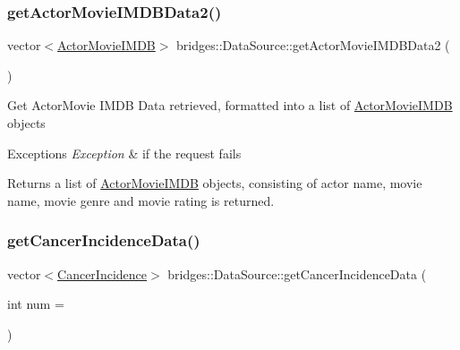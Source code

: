 \subsubsection{\texorpdfstring{getActorMovieIMDBData2()}{getActorMovieIMDBData2()}}
{\footnotesize\ttfamily vector$<$\mbox{\hyperlink{classbridges_1_1_actor_movie_i_m_d_b}{Actor\+Movie\+I\+M\+DB}}$>$ bridges\+::\+Data\+Source\+::get\+Actor\+Movie\+I\+M\+D\+B\+Data2 (\begin{DoxyParamCaption}{ }\end{DoxyParamCaption})\hspace{0.3cm}{\ttfamily [inline]}}

Get Actor\+Movie I\+M\+DB Data retrieved, formatted into a list of \mbox{\hyperlink{classbridges_1_1_actor_movie_i_m_d_b}{Actor\+Movie\+I\+M\+DB}} objects


\begin{DoxyExceptions}{Exceptions}
{\em Exception} & if the request fails\\
\hline
\end{DoxyExceptions}
\begin{DoxyReturn}{Returns}
a list of \mbox{\hyperlink{classbridges_1_1_actor_movie_i_m_d_b}{Actor\+Movie\+I\+M\+DB}} objects, consisting of actor name, movie name, movie genre and movie rating is returned. 
\end{DoxyReturn}
\mbox{\label{classbridges_1_1_data_source_a52d8161e7c093ab3615acea7085f6689}} 
\subsubsection{\texorpdfstring{getCancerIncidenceData()}{getCancerIncidenceData()}}
{\footnotesize\ttfamily vector$<$\mbox{\hyperlink{classbridges_1_1_cancer_incidence}{Cancer\+Incidence}}$>$ bridges\+::\+Data\+Source\+::get\+Cancer\+Incidence\+Data (\begin{DoxyParamCaption}\item[{int}]{num = {} }\end{DoxyParamCaption})\hspace{0.3cm}{\ttfamily [inline]}}

\mbox{\label{classbridges_1_1_data_source_aa65136879011e1ec237380ef8587fea2}} 

